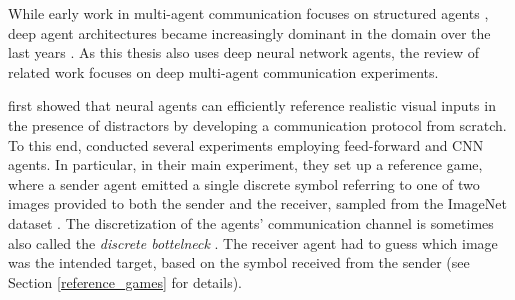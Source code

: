 While early work in multi-agent communication focuses on structured agents \parencite[e.~g.,~see][for reviews]{christiansen2003language, cangelosi2002symbol}, deep agent architectures became increasingly dominant in the domain over the last years \parencite{lazaridou2020emergent}. As this thesis also uses deep neural network agents, the review of related work focuses on deep multi-agent communication experiments. 


\cite{lazaridou2016multi} first showed that neural agents can efficiently reference realistic visual inputs in the presence of distractors by developing a communication protocol from scratch. To this end, \textcite{lazaridou2016multi} conducted several experiments employing feed-forward and CNN agents. In particular, in their main experiment, they set up a reference game, where a sender agent emitted a single discrete symbol referring to one of two images provided to both the sender and the receiver, sampled from the ImageNet dataset \parencite{deng2009imagenet}. The discretization of the agents' communication channel is sometimes also called the \textit{discrete bottelneck} \parencite{lazaridou2020multi}. 
The receiver agent had to guess  which image was the intended target, based on the symbol received from the sender (see Section \ref{reference_games} for details). %
